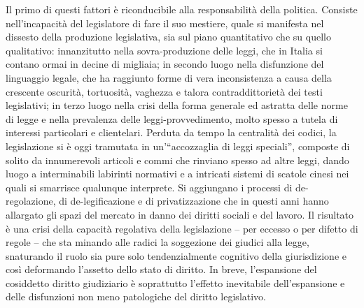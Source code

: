 Il primo di questi fattori è riconducibile alla responsabilità della politica. Consiste nell’incapacità del legislatore di fare il suo mestiere, quale si manifesta nel dissesto della produzione legislativa, sia sul piano quantitativo che su quello qualitativo: innanzitutto nella sovra-produzione delle leggi, che in Italia si contano ormai in decine di migliaia; in secondo luogo nella disfunzione del linguaggio legale, che ha raggiunto forme di vera inconsistenza a causa della crescente oscurità, tortuosità, vaghezza e talora contraddittorietà dei testi legislativi; in terzo luogo nella crisi della forma generale ed astratta delle norme di legge e nella prevalenza delle leggi-provvedimento, molto spesso a tutela di interessi particolari e clientelari. Perduta da tempo la centralità dei codici, la legislazione si è oggi tramutata in un’“accozzaglia di leggi speciali”, composte di solito da innumerevoli articoli e commi che rinviano spesso ad altre leggi, dando luogo a interminabili labirinti normativi e a intricati sistemi di scatole cinesi nei quali si smarrisce qualunque interprete. Si aggiungano i processi di de-regolazione, di de-legificazione e di privatizzazione che in questi anni hanno allargato gli spazi del mercato in danno dei diritti sociali e del lavoro. Il risultato è una crisi della capacità regolativa della legislazione – per eccesso o per difetto di regole – che sta minando alle radici la soggezione dei giudici alla legge, snaturando il ruolo sia pure solo tendenzialmente cognitivo della giurisdizione e così deformando l’assetto dello stato di diritto. In breve, l’espansione del cosiddetto diritto giudiziario è soprattutto l’effetto inevitabile dell’espansione e delle disfunzioni non meno patologiche del diritto legislativo.
